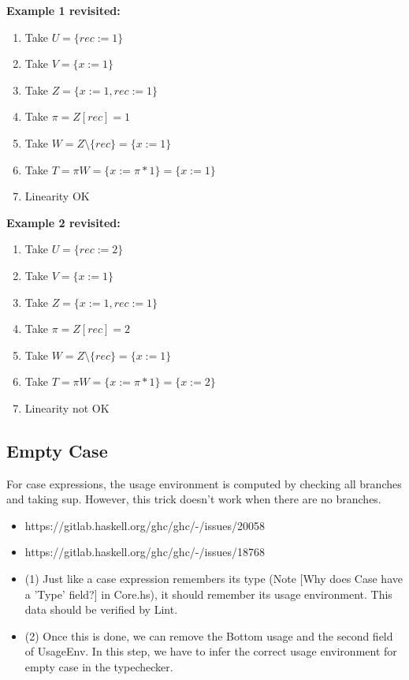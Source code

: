 \documentclass[a4paper, draft]{article}
\begin{document}
\textbf{Example 1 revisited:}
\begin{enumerate}
    \item Take $U = \{rec := 1\}$
    \item Take $V = \{x := 1\}$
    \item Take $Z = \{x := 1, rec := 1\}$
    \item Take $\pi = Z[rec] = 1$
    \item Take $W = Z \setminus \{rec\} = \{x := 1\}$
    \item Take $T = \pi W = \{x := \pi * 1\} = \{x := 1\}$
    \item Linearity OK
\end{enumerate}

\textbf{Example 2 revisited:}
\begin{enumerate}
    \item Take $U = \{rec := 2\}$
    \item Take $V = \{x := 1\}$
    \item Take $Z = \{x := 1, rec := 1\}$
    \item Take $\pi = Z[rec] = 2$
    \item Take $W = Z \setminus \{rec\} = \{x := 1\}$
    \item Take $T = \pi W = \{x := \pi * 1\} = \{x := 2\}$
    \item Linearity not OK
\end{enumerate}

\subsection{Empty Case}

For case expressions, the usage environment is computed by checking all branches
and taking sup. However, this trick doesn't work when there are no branches.

\begin{itemize}
\item https://gitlab.haskell.org/ghc/ghc/-/issues/20058
\item https://gitlab.haskell.org/ghc/ghc/-/issues/18768

\item (1) Just like a case expression remembers its type (Note [Why does Case have a
'Type' field?] in Core.hs), it should remember its usage environment. This data
should be verified by Lint.

\item (2) Once this is done, we can remove the Bottom usage and the second field of
UsageEnv. In this step, we have to infer the correct usage environment for empty
case in the typechecker.
\end{itemize}
\end{document}
